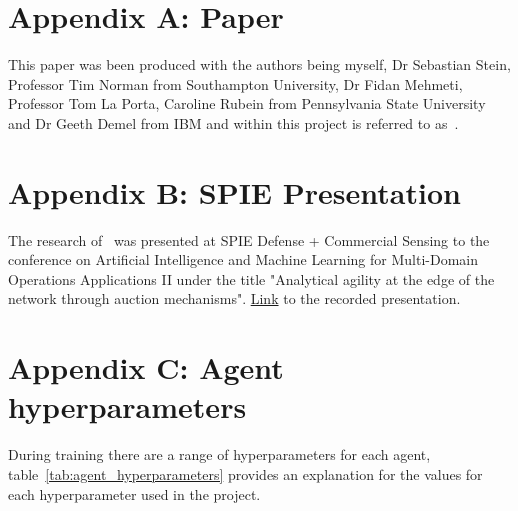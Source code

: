 
\section*{Appendix A: Paper}
\label{app:paper}
This paper was been produced with the authors being myself, Dr Sebastian Stein, Professor Tim Norman from Southampton
University, Dr Fidan Mehmeti, Professor Tom La Porta, Caroline Rubein from Pennsylvania State University and Dr Geeth
Demel from IBM and within this project is referred to as~\cite{FlexibleResourceAllocation}.



\section*{Appendix B: SPIE Presentation}
\label{app:spie-presentation}
The research of~\cite{FlexibleResourceAllocation} was presented at SPIE Defense + Commercial Sensing to the conference
on Artificial Intelligence and Machine Learning for Multi-Domain Operations Applications II under the title
"Analytical agility at the edge of the network through auction mechanisms".
\href{https://spie.org/SI/conferencedetails/artificial-intelligence-and-machine-learning-for-multi-domain-battle-applications#2560056}{Link}
to the recorded presentation.



\section*{Appendix C: Agent hyperparameters}
\label{app:agent-hyperparameters}
During training there are a range of hyperparameters for each agent, table~\ref{tab:agent_hyperparameters} provides
an explanation for the values for each hyperparameter used in the project.

